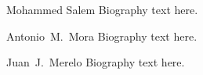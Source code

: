 \documentclass[10pt,journal,compsoc]{IEEEtran}
\begin{document}

%
%
%
%
%

% 

\begin{IEEEbiography}{Mohammed Salem}
Biography text here.
\end{IEEEbiography}

\begin{IEEEbiographynophoto}{Antonio~M.~Mora}
Biography text here.
\end{IEEEbiographynophoto}






\begin{IEEEbiographynophoto}{Juan~J.~Merelo}
Biography text here.
\end{IEEEbiographynophoto}






\end{document}
